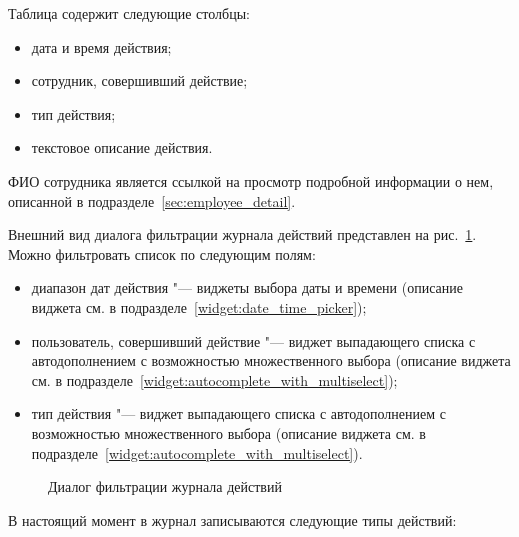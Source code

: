 Таблица содержит следующие столбцы:
\begin{itemize}
	\item дата и время действия;
	\item сотрудник, совершивший действие;
	\item тип действия;
	\item текстовое описание действия.
\end{itemize}

ФИО сотрудника является ссылкой на просмотр подробной информации о нем, описанной в подразделе~\ref{sec:employee_detail}.

Внешний вид диалога фильтрации журнала действий представлен на рис.~\ref{img:employee:log_list_filter}.
Можно фильтровать список по следующим полям:

\begin{itemize}
	\item диапазон дат действия "--- виджеты выбора даты и времени 
	(описание виджета см. в подразделе~\ref{widget:date_time_picker});
	\item пользователь, совершивший действие "--- виджет выпадающего списка с автодополнением с возможностью множественного выбора 
	(описание виджета см. в подразделе~\ref{widget:autocomplete_with_multiselect});
	\item тип действия "--- виджет выпадающего списка с автодополнением с возможностью множественного выбора
	(описание виджета см. в подразделе~\ref{widget:autocomplete_with_multiselect}).
\end{itemize}

\begin{figure}[H]
	\caption{Диалог фильтрации журнала действий}
	\label{img:employee:log_list_filter}
\end{figure}

В настоящий момент в журнал записываются следующие типы действий:

